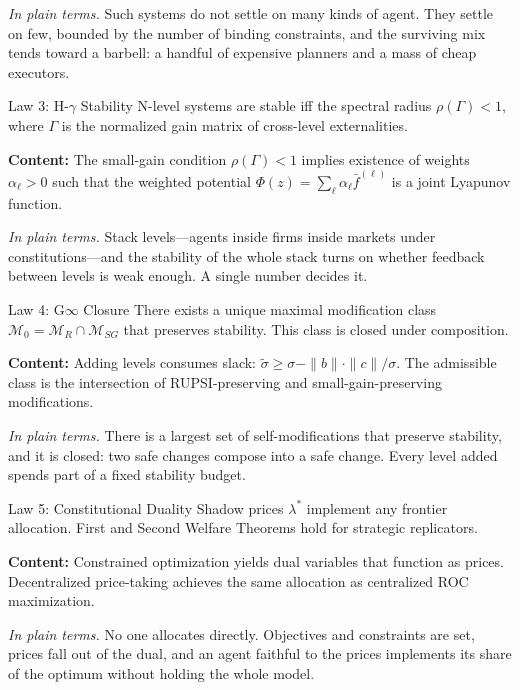 \documentclass[12pt]{article}
\begin{document}
\noindent\textit{In plain terms.} Such systems do not settle on many kinds of agent. They settle on few, bounded by the number of binding constraints, and the surviving mix tends toward a barbell: a handful of expensive planners and a mass of cheap executors.

\begin{lawbox}{Law 3: H-$\gamma$ Stability}
N-level systems are stable iff the spectral radius $\rho(\Gamma) < 1$, where $\Gamma$ is the normalized gain matrix of cross-level externalities.
\end{lawbox}

\noindent\textbf{Content:} The small-gain condition $\rho(\Gamma) < 1$ implies existence of weights $\alpha_\ell > 0$ such that the weighted potential $\Phi(z) = \sum_\ell \alpha_\ell \bar{f}^{(\ell)}$ is a joint Lyapunov function.

\noindent\textit{In plain terms.} Stack levels---agents inside firms inside markets under constitutions---and the stability of the whole stack turns on whether feedback between levels is weak enough. A single number decides it.

\begin{lawbox}{Law 4: G$\infty$ Closure}
There exists a unique maximal modification class $\mathcal{M}_0 = \mathcal{M}_R \cap \mathcal{M}_{SG}$ that preserves stability. This class is closed under composition.
\end{lawbox}

\noindent\textbf{Content:} Adding levels consumes slack: $\tilde{\sigma} \geq \sigma - \|b\| \cdot \|c\| / \sigma$. The admissible class is the intersection of RUPSI-preserving and small-gain-preserving modifications.

\noindent\textit{In plain terms.} There is a largest set of self-modifications that preserve stability, and it is closed: two safe changes compose into a safe change. Every level added spends part of a fixed stability budget.

\begin{lawbox}{Law 5: Constitutional Duality}
Shadow prices $\lambda^*$ implement any frontier allocation. First and Second Welfare Theorems hold for strategic replicators.
\end{lawbox}

\noindent\textbf{Content:} Constrained optimization yields dual variables that function as prices. Decentralized price-taking achieves the same allocation as centralized ROC maximization.

\noindent\textit{In plain terms.} No one allocates directly. Objectives and constraints are set, prices fall out of the dual, and an agent faithful to the prices implements its share of the optimum without holding the whole model.
\end{document}
